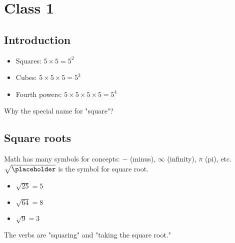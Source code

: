 \documentclass{hw}
\begin{document}
\section*{Class 1}
\subsection*{\normalsize Introduction}
\begin{itemize}
    \item Squares: $5 \times 5 = 5^2$
    \item Cubes: $5 \times 5 \times 5 = 5^3$
    \item Fourth powers: $5 \times 5 \times 5 \times 5 = 5^4$
\end{itemize}
Why the special name for "square"?

\subsection*{\normalsize Square roots}
Math has many symbols for concepts: $-$ (minus), $\infty$ (infinity), $\pi$ (pi), etc.
\\ \bigskip
$\mathbf{\sqrt{\placeholder}}$ is the symbol for square root.
\begin{itemize}
    \item $\sqrt{25} = 5$
    \item $\sqrt{64} = 8$
    \item $\sqrt{9} = 3$
\end{itemize}
The verbs are "squaring" and "taking the square root."
\end{document}
